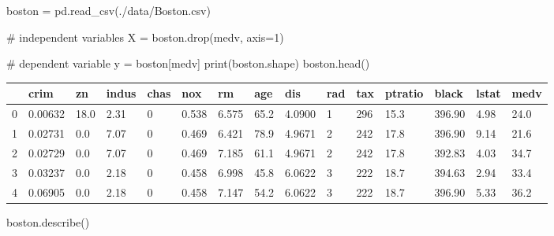 \documentclass[
  letterpaper,
  DIV=11,
  numbers=noendperiod]{scrreprt}
\newenvironment{Shaded}{\begin{snugshade}}{\end{snugshade}}
\newcommand{\BuiltInTok}[1]{\textcolor[rgb]{0.00,0.23,0.31}{#1}}
\newcommand{\CommentTok}[1]{\textcolor[rgb]{0.37,0.37,0.37}{#1}}
\newcommand{\DecValTok}[1]{\textcolor[rgb]{0.68,0.00,0.00}{#1}}
\newcommand{\NormalTok}[1]{\textcolor[rgb]{0.00,0.23,0.31}{#1}}
\newcommand{\OperatorTok}[1]{\textcolor[rgb]{0.37,0.37,0.37}{#1}}
\newcommand{\StringTok}[1]{\textcolor[rgb]{0.13,0.47,0.30}{#1}}
\begin{document}
\begin{Shaded}
\begin{Highlighting}[]
\NormalTok{boston }\OperatorTok{=}\NormalTok{ pd.read\_csv(}\StringTok{\textquotesingle{}./data/Boston.csv\textquotesingle{}}\NormalTok{)}

\CommentTok{\# independent variables}
\NormalTok{X }\OperatorTok{=}\NormalTok{ boston.drop(}\StringTok{\textquotesingle{}medv\textquotesingle{}}\NormalTok{, axis}\OperatorTok{=}\DecValTok{1}\NormalTok{)}

\CommentTok{\# dependent variable}
\NormalTok{y }\OperatorTok{=}\NormalTok{ boston[}\StringTok{\textquotesingle{}medv\textquotesingle{}}\NormalTok{]}
\BuiltInTok{print}\NormalTok{(boston.shape)}
\NormalTok{boston.head()}
\end{Highlighting}
\end{Shaded}

\begin{longtable}[]{@{}lllllllllllllll@{}}
\toprule()
& crim & zn & indus & chas & nox & rm & age & dis & rad & tax & ptratio
& black & lstat & medv \\
\midrule()
\endhead
0 & 0.00632 & 18.0 & 2.31 & 0 & 0.538 & 6.575 & 65.2 & 4.0900 & 1 & 296
& 15.3 & 396.90 & 4.98 & 24.0 \\
1 & 0.02731 & 0.0 & 7.07 & 0 & 0.469 & 6.421 & 78.9 & 4.9671 & 2 & 242 &
17.8 & 396.90 & 9.14 & 21.6 \\
2 & 0.02729 & 0.0 & 7.07 & 0 & 0.469 & 7.185 & 61.1 & 4.9671 & 2 & 242 &
17.8 & 392.83 & 4.03 & 34.7 \\
3 & 0.03237 & 0.0 & 2.18 & 0 & 0.458 & 6.998 & 45.8 & 6.0622 & 3 & 222 &
18.7 & 394.63 & 2.94 & 33.4 \\
4 & 0.06905 & 0.0 & 2.18 & 0 & 0.458 & 7.147 & 54.2 & 6.0622 & 3 & 222 &
18.7 & 396.90 & 5.33 & 36.2 \\
\bottomrule()
\end{longtable}

\begin{Shaded}
\begin{Highlighting}[]
\NormalTok{boston.describe()}
\end{Highlighting}
\end{Shaded}
\end{document}
